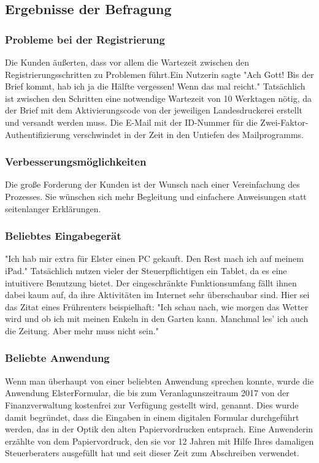 \subsection{Ergebnisse der Befragung}\label{Ergebnisse der Befragung}

\subsubsection{Probleme bei der Registrierung}
Die Kunden äußerten, dass vor allem die Wartezeit zwischen den Registrierungsschritten zu Problemen führt.Ein Nutzerin sagte "Ach Gott! Bis der Brief kommt, hab ich ja die Hälfte vergessen! Wenn das mal reicht." Tatsächlich ist zwischen den Schritten eine notwendige Wartezeit von 10 Werktagen nötig, da der Brief mit dem Aktivierungscode von der jeweiligen Landesdruckerei erstellt und versandt werden muss. Die E-Mail mit der ID-Nummer für die Zwei-Faktor-Authentifizierung verschwindet in der Zeit in den Untiefen des Mailprogramms.

\subsubsection{Verbesserungsmöglichkeiten}
Die  große Forderung der Kunden ist der Wunsch nach einer Vereinfachung des Prozesses. Sie wünschen sich mehr Begleitung und einfachere Anweisungen statt seitenlanger Erklärungen.

\subsubsection{Beliebtes Eingabegerät}
"Ich hab mir extra für Elster einen PC gekauft. Den Rest mach ich auf meinem iPad." Tatsächlich nutzen vieler der Steuerpflichtigen ein Tablet, da es eine intuitivere Benutzung bietet. Der eingeschränkte Funktionsumfang fällt ihnen dabei kaum auf, da ihre Aktivitäten im Internet sehr überschaubar sind. Hier sei das Zitat eines Frührenters beispielhaft: "Ich schau nach, wie morgen das Wetter wird und ob ich mit meinen Enkeln in den Garten kann. Manchmal les' ich auch die Zeitung. Aber mehr muss nicht sein."

\subsubsection{Beliebte Anwendung}
Wenn man überhaupt von einer \grq{}beliebten\grq{} Anwendung sprechen konnte, wurde die Anwendung ElsterFormular, die bis zum Veranlagunszeitraum 2017 von der Finanzverwaltung kostenfrei zur Verfügung gestellt wird, genannt. Dies wurde damit begründet, dass die Eingaben in einem digitalen Formular durchgeführt werden, das in der Optik den alten Papiervordrucken entsprach. Eine Anwenderin erzählte von dem Papiervordruck, den sie vor 12 Jahren mit Hilfe Ihres damaligen Steuerberaters ausgefüllt hat und seit dieser Zeit zum Abschreiben verwendet.

